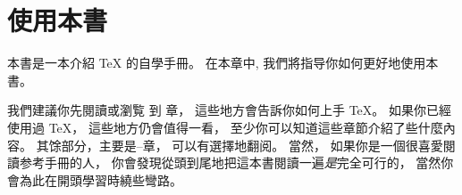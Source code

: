 

\chapter{使用本書}



本書是一本介紹 \TeX{} 的自學手冊。
在本章中, 我們將指导你如何更好地使用本書。


我們建議你先閱讀或瀏覧  到 
章，
這些地方會告訴你如何上手 \TeX。
如果你已經使用過 \TeX， 這些地方仍會值得一看，
至少你可以知道這些章節介紹了些什麼內容。
其馀部分，主要是--章，
可以有選擇地翻阅。
當然， 如果你是一個很喜愛閱讀参考手冊的人，
你會發現從頭到尾地把這本書閱讀一遍\emph{是}完全可行的，
當然你會為此在開頭學習時繞些彎路。



